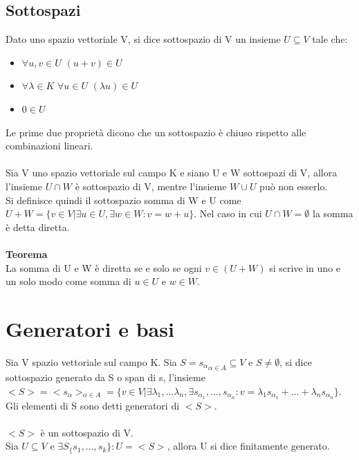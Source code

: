 \documentclass{article}
\begin{document}
\subsection{Sottospazi}
Dato uno spazio vettoriale V, si dice sottospazio di V un insieme $U\subseteq V$ tale che:
\begin{itemize}
    \item $\forall u,v\in U$ $(u+v)\in U$
    \item $\forall \lambda\in K$ $\forall u\in U$ $(\lambda u)\in U$
    \item $0\in U$
\end{itemize}
Le prime due proprietà dicono che un sottospazio è chiuso rispetto alle combinazioni lineari.\\\\
Sia V uno spazio vettoriale sul campo K e siano U e W sottospazi di V, allora l'insieme $U\cap W$ è sottospazio di V, mentre l'insieme $W\cup U$ può non esserlo.\\
Si definisce quindi il sottospazio somma di W e U come $U+W=\{v\in V|\exists u\in U, \exists w\in W: v=w+u\}$. Nel caso in cui $U\cap W=\emptyset$ la somma è detta diretta.\\\\
\textbf{Teorema}\\
La somma di U e W è diretta se e solo se ogni $v\in (U+W)$ si scrive in uno e un solo modo come somma di $u\in U$ e $w\in W$.

\section{Generatori e basi}
Sia V spazio vettoriale sul campo K. Sia $S={s_\alpha}_{\alpha\in A}\subseteq V$ e $S\neq\emptyset$, si dice sottospazio generato da S o span di s, l'insieme $<S>=<s_\alpha>_{\alpha\in A}=\{v\in V|\exists \lambda_1,...\lambda_n, \exists s_{\alpha_1},...,s_{\alpha_n}: v=\lambda_1 s_{\alpha_1}+...+\lambda_n s_{\alpha_n}\}$.\\
Gli elementi di S sono detti generatori di $<S>$.\\\\
$<S>$ è un sottospazio di V.\\
Sia $U\subseteq V$ e $\exists S_\{s_1,...,s_k\}: U=<S>$, allora U si dice finitamente generato.
\end{document}
